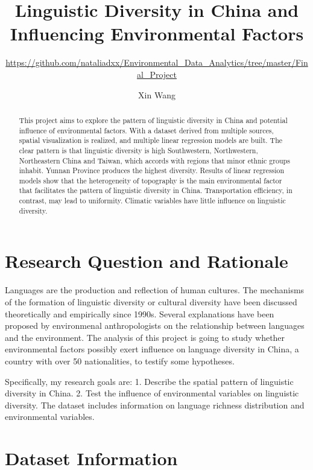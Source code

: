\documentclass[12pt,]{article}
\title{Linguistic Diversity in China and Influencing Environmental Factors}
\subtitle{\url{https://github.com/nataliadxx/Environmental_Data_Analytics/tree/master/Final_Project}}
\author{Xin Wang}
\date{}
\begin{document}
\maketitle
\begin{abstract}
This project aims to explore the pattern of linguistic diversity in
China and potential influence of environmental factors. With a dataset
derived from multiple sources, spatial visualization is realized, and
multiple linear regression models are built. The clear pattern is that
linguistic diversity is high Southwestern, Northwestern, Northeastern
China and Taiwan, which accords with regions that minor ethnic groups
inhabit. Yunnan Province produces the highest diversity. Results of
linear regression models show that the heterogeneity of topography is
the main environmental factor that facilitates the pattern of linguistic
diversity in China. Transportation efficiency, in contrast, may lead to
uniformity. Climatic variables have little influence on linguistic
diversity.
\end{abstract}

\newpage

\tableofcontents  \newpage
\listoffigures  \newpage

\section{Research Question and
Rationale}\label{research-question-and-rationale}

Languages are the production and reflection of human cultures. The
mechanisms of the formation of linguistic diversity or cultural
diversity have been discussed theoretically and empirically since 1990s.
Several explanations have been proposed by environmenal anthropologists
on the relationship between languages and the environment. The analysis
of this project is going to study whether environmental factors possibly
exert influence on language diversity in China, a country with over 50
nationalities, to testify some hypotheses.

Specifically, my research goals are: 1. Describe the spatial pattern of
linguistic diversity in China. 2. Test the influence of environmental
variables on linguistic diversity. The dataset includes information on
language richness distribution and environmental variables.

\newpage

\section{Dataset Information}\label{dataset-information}
\end{document}
